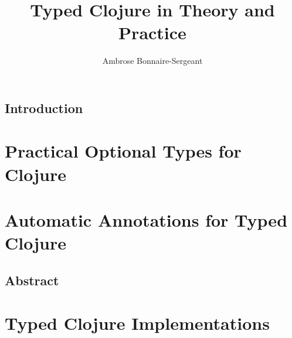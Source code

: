\documentclass{book}
\title{Typed Clojure in Theory and Practice}
\author{Ambrose Bonnaire-Sergeant}
\begin{document}
\frontmatter %

\maketitle

\tableofcontents

\newpage

\mainmatter

\chapter{Introduction}



\part{Practical Optional Types for Clojure}
\label{part:types}









\part{Automatic Annotations for Typed Clojure}
\label{part:autoann}

\chapter{Abstract}







%


%
%
%
%

\part{Typed Clojure Implementations}
\label{part:implementations}

\end{document}
